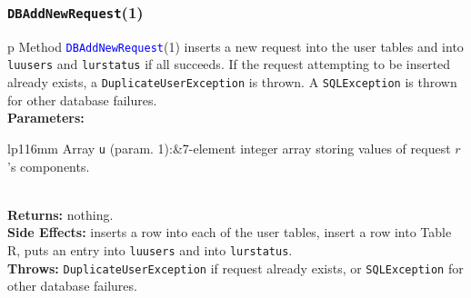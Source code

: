 \documentclass{article}
\theoremstyle{definition}                   %
\begin{document}
\subsubsection{{\tt{}\protect{}DBAddNewRequest}(1)}
\begin{tabular}{p{\textwidth}}
\toprule
{}
Method \textcolor{blue}{{\tt{}\protect{}DBAddNewRequest}}(1) inserts a new request into the
user tables and into {\tt{}\protect{}lu{}users} and {\tt{}\protect{}lu{}rstatus} if all succeeds.  If the
request attempting to be inserted already exists, a {\tt{}DuplicateUserException}
is thrown. A {\tt{}SQLException} is thrown for other database failures.\\
\midrule
\textbf{Parameters:} \\
\begin{tabular}{lp{116mm}}
Array {\tt{}u} (param. 1):&7-element integer array storing values of
request $r$'s components.

\end{tabular}\\
\textbf{Returns:} nothing.\\
\textbf{Side Effects:} inserts a row into each of the user tables, insert a
row into Table R, puts an entry into {\tt{}\protect{}lu{}users} and into {\tt{}\protect{}lu{}rstatus}.\\
\textbf{Throws:} {\tt{}DuplicateUserException} if request already exists, or
{\tt{}SQLException} for other database failures.\\
\bottomrule
\end{tabular}
\nwenddocs{}\endmoddef{}
\end{document}
